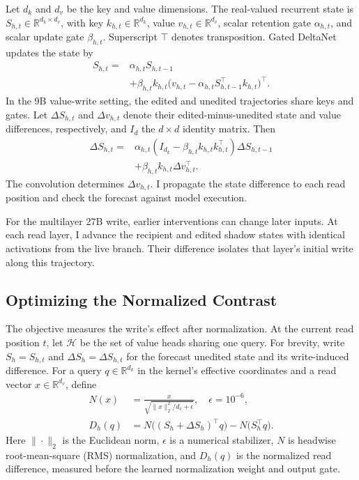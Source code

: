\documentclass[letterpaper]{article}
\newcommand{\R}{\mathbb{R}}
\begin{document}
Let $d_k$ and $d_v$ be the key and value dimensions. The real-valued
recurrent state is $S_{h,t}\in\R^{d_k\times d_v}$, with key
$k_{h,t}\in\R^{d_k}$, value $v_{h,t}\in\R^{d_v}$, scalar retention
gate $\alpha_{h,t}$, and scalar update gate $\beta_{h,t}$.
Superscript $\top$ denotes transposition. Gated DeltaNet updates the
state by \citep{yang2025}
\begin{equation}
\begin{split}
S_{h,t}={}&\alpha_{h,t} S_{h,t-1}\\
&+\beta_{h,t} k_{h,t}\bigl(v_{h,t}-\alpha_{h,t} S_{h,t-1}^{\top}k_{h,t}\bigr)^{\top}.
\end{split}
\label{eq:state}
\end{equation}
In the 9B value-write setting, the edited and unedited trajectories
share keys and gates. Let $\Delta S_{h,t}$ and $\Delta v_{h,t}$ denote
their edited-minus-unedited state and value differences, respectively,
and $I_d$ the $d\times d$ identity matrix. Then
\begin{equation}
\begin{split}
\Delta S_{h,t}={}&\alpha_{h,t}(I_{d_k}-\beta_{h,t} k_{h,t}k_{h,t}^{\top})\Delta S_{h,t-1}\\
&+\beta_{h,t} k_{h,t}\Delta v_{h,t}^{\top}.
\end{split}
\label{eq:forecast}
\end{equation}
The convolution determines $\Delta v_{h,t}$. I propagate the state difference
to each read position and check the forecast against model execution.

For the multilayer 27B write, earlier interventions can change later
inputs. At each read layer, I advance the recipient and edited shadow
states with identical activations from the live branch. Their difference
isolates that layer's initial write along this trajectory.

\subsection{Optimizing the Normalized Contrast}
The objective measures the write's effect after normalization.
At the current read position $t$, let $\mathcal H$ be the set of value
heads sharing one query. For brevity, write $S_h=S_{h,t}$ and
$\Delta S_h=\Delta S_{h,t}$ for the forecast unedited state and its
write-induced difference. For a query $q\in\R^{d_k}$ in the kernel's
effective coordinates and a read vector $x\in\R^{d_v}$, define
\begin{align}
N(x)&=\frac{x}{\sqrt{\|x\|_2^2/d_v+\epsilon}},\quad \epsilon=10^{-6},\\
D_h(q)&=N\bigl((S_h+\Delta S_h)^\top q\bigr)
-N\bigl(S_h^\top q\bigr).
\end{align}
Here $\|\cdot\|_2$ is the Euclidean norm, $\epsilon$ is a numerical
stabilizer, $N$ is headwise root-mean-square (RMS) normalization, and
$D_h(q)$ is the normalized read difference, measured before the learned
normalization weight and output gate.
\end{document}
